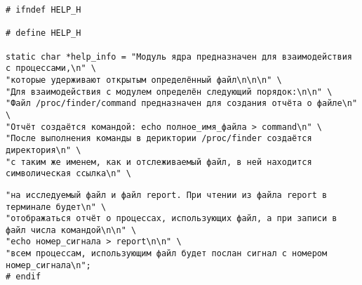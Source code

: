 \begin{center}
	\begin{lstlisting}[label=listing_help_h1,caption=Файл help.h]
# ifndef HELP_H

# define HELP_H

static char *help_info = "Модуль ядра предназначен для взаимодействия с процессами,\n" \
"которые удерживают открытым определённый файл\n\n\n" \
"Для взаимодействия с модулем определён следующий порядок:\n\n" \
"Файл /proc/finder/command предназначен для создания отчёта о файле\n" \
"Отчёт создаётся командой: echo полное_имя_файла > command\n" \
"После выполнения команды в дериктории /proc/finder создаётся директория\n" \
"с таким же именем, как и отслеживаемый файл, в ней находится символическая ссылка\n" \
\end{lstlisting}
\end{center}

\begin{center}
\begin{lstlisting}[label=listing_help_h2,caption=Файл help.h]
"на исследуемый файл и файл report. При чтении из файла report в терминале будет\n" \
"отображаться отчёт о процессах, использующих файл, а при записи в файл числа командой\n\n" \
"echo номер_сигнала > report\n\n" \
"всем процессам, использующим файл будет послан сигнал с номером номер_сигнала\n";
# endif

	\end{lstlisting}
\end{center}
